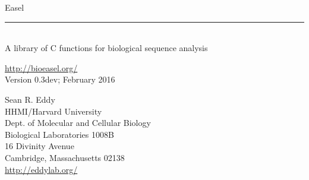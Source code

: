 \begin{titlepage}
{\Large

\vspace*{\fill}

\noindent
{\Huge{Easel}} \\ 
\rule[2pt]{\textwidth}{1pt} \\
\hspace*{\fill} {\large {A library of C functions for
    biological sequence analysis} \\ }

\vspace*{\fill}

\begin{center}
\url{http://bioeasel.org/}\\
Version 0.3dev; February 2016 \\ 

\vspace*{\fill}

Sean R. Eddy\\
HHMI/Harvard University\\
Dept. of Molecular and Cellular Biology\\
Biological Laboratories 1008B\\
16 Divinity Avenue\\
Cambridge, Massachusetts 02138\\
\url{http://eddylab.org/}\\
\end{center}

\vspace*{\fill}
}
\end{titlepage}
